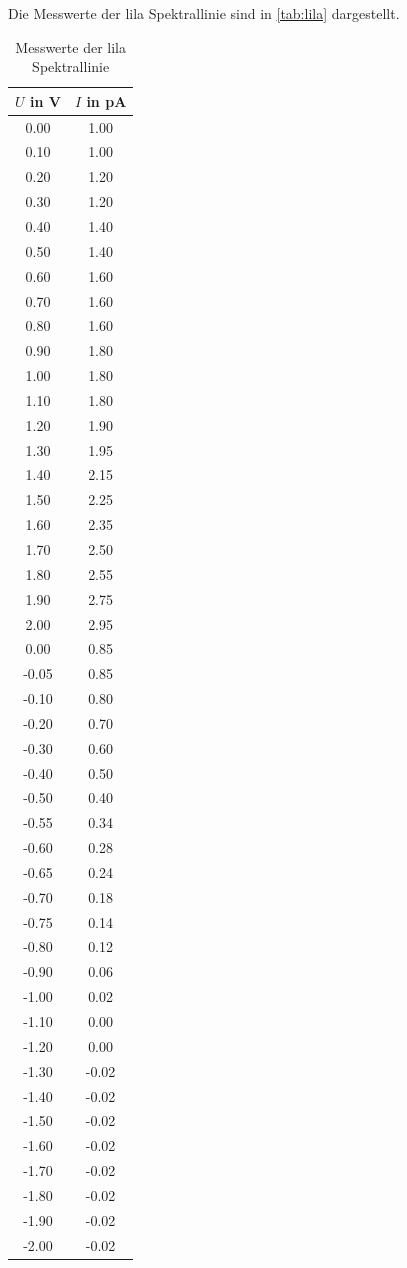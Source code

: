 Die Messwerte der lila Spektrallinie sind in \autoref{tab:lila} dargestellt.
\begin{table}
    \centering 
    \caption{Messwerte der lila Spektrallinie}
\begin{tabular}{c c}
    \toprule
    $U$ in V&$I$ in pA \\
    \midrule
    0.00 & 1.00 \\
     0.10 & 1.00 \\
     0.20 & 1.20 \\
     0.30 & 1.20 \\
     0.40 & 1.40 \\
     0.50 & 1.40 \\
     0.60 & 1.60 \\
     0.70 & 1.60 \\
     0.80 & 1.60 \\
     0.90 & 1.80 \\
     1.00 & 1.80 \\
     1.10 & 1.80 \\
     1.20 & 1.90 \\
     1.30 & 1.95 \\
     1.40 & 2.15 \\
     1.50 & 2.25 \\
     1.60 & 2.35 \\
     1.70 & 2.50 \\
     1.80 & 2.55 \\
     1.90 & 2.75 \\
     2.00 & 2.95 \\
     0.00 & 0.85 \\
    -0.05 & 0.85 \\
    -0.10 & 0.80 \\
    -0.20 & 0.70 \\
    -0.30 & 0.60 \\
    -0.40 & 0.50 \\
    -0.50 & 0.40 \\
    -0.55 & 0.34 \\
    -0.60 & 0.28 \\
    -0.65 & 0.24 \\
    -0.70 & 0.18 \\
    -0.75 & 0.14 \\
    -0.80 & 0.12 \\
    -0.90 & 0.06 \\
    -1.00 & 0.02 \\
    -1.10 & 0.00 \\
    -1.20 & 0.00 \\
   -1.30 & -0.02 \\
   -1.40 & -0.02 \\
   -1.50 & -0.02 \\
   -1.60 & -0.02 \\
   -1.70 & -0.02 \\
   -1.80 & -0.02 \\
   -1.90 & -0.02 \\
   -2.00 & -0.02 \\
    \bottomrule
    \end{tabular}
    \label{tab:lila}
\end{table}
